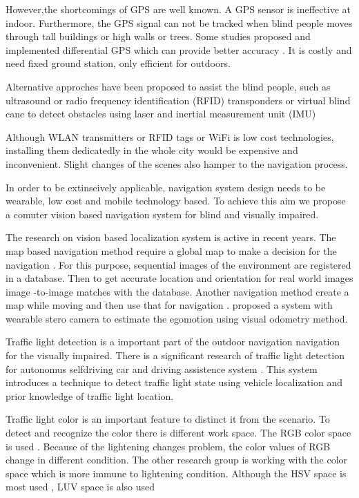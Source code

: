 However,the shortcomings of GPS are well kmown.
A GPS sensor is ineffective at indoor.
Furthermore, the GPS signal can not be tracked when blind people moves through tall buildings or high walls or trees.
Some studies proposed and implemented differential GPS which can provide better accuracy \cite{drishti2,gps}.
It is costly and need fixed ground station, only efficient for outdoors.

Alternative approches have been proposed to assist the blind people, such as ultrasound \cite{drishti} or radio frequency identification (RFID) \cite{rfid} transponders or virtual blind cane to detect obstacles using laser and inertial measurement unit (IMU) \cite {virtual}

Although WLAN transmitters or RFID tags or WiFi is low cost technologies, installing them dedicatedly in the whole city would be expensive and inconvenient.
Slight changes of the scenes also hamper to the navigation process.

In order to be extinseively applicable, navigation system design needs to be wearable, low cost and mobile technology based.
To achieve this aim we propose a comuter vision based navigation system for blind and visually impaired.

The research on vision based localization system is active in recent years.
The map based navigation method require a global map to make a decision for the navigation \cite{online,map,map2}.
For this purpose, sequential images of the environment are registered in a database.
Then to get accurate location and orientation for real world images image -to-image matches with the database.
Another navigation method create a map while moving and then use that for navigation \cite{fly,fly2,fly3}. 
\cite{visual} proposed a system with wearable stero camera to estimate the egomotion using visual odometry method.



Traffic light detection is a important part of the outdoor navigation navigation for the visually impaired.
There is a significant research of traffic light detection for autonomus selfdriving car and driving assistence system \cite{traffic_turan,selfdrive,traffic,traffic2,traffic3}.
This system introduces a technique to detect traffic light state using vehicle localization and prior knowledge of traffic light location.


Traffic light color is an important feature to distinct it from the scenario.
To detect and recognize the color there is different work space.
The RGB color space is used \cite{rgb2}.
Because of the lightening changes problem, the color values of RGB change in different condition.
The other research group is working with the color space which is more immune to lightening condition.
Although the HSV space is most used , LUV space is also used \cite{luv}


